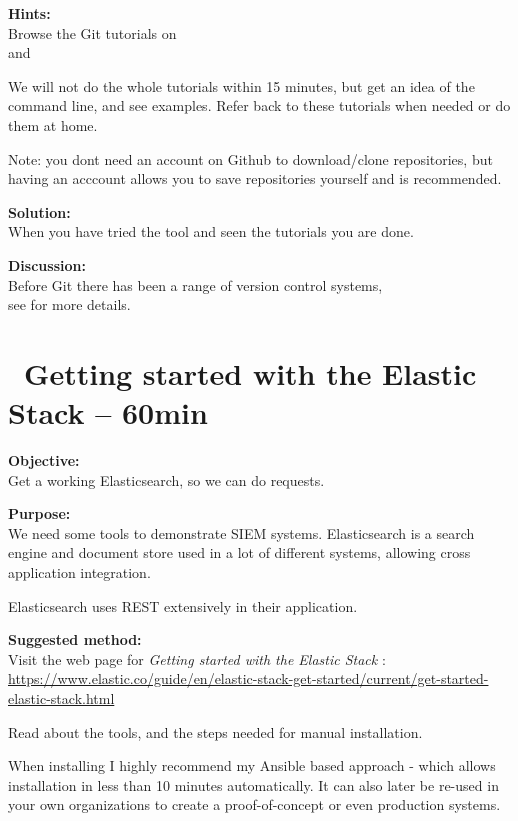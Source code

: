 \documentclass[a4paper,11pt,notitlepage]{report}
\begin{document}
{\bf Hints:}\\
Browse the Git tutorials on \\
and 

We will not do the whole tutorials within 15 minutes, but get an idea of the command line, and see examples. Refer back to these tutorials when needed or do them at home.

Note: you dont need an account on Github to download/clone repositories, but having an acccount allows you to save repositories yourself and is recommended.

{\bf Solution:}\\
When you have tried the tool and seen the tutorials you are done.

{\bf Discussion:}\\
Before Git there has been a range of version control systems,\\
see  for more details.




\chapter{\faExclamationTriangle\ Getting started with the Elastic Stack -- 60min}
\label{gettingstartedelastic}



{\bf Objective:}\\
Get a working Elasticsearch, so we can do requests.

{\bf Purpose:}\\
We need some tools to demonstrate SIEM systems. Elasticsearch is a search engine and document store used in a lot of different systems, allowing cross application integration.

Elasticsearch uses REST extensively in their application.

{\bf Suggested method:}\\
Visit the web page for \emph{Getting started with the Elastic Stack} :\\
{\footnotesize\url{https://www.elastic.co/guide/en/elastic-stack-get-started/current/get-started-elastic-stack.html}}

Read about the tools, and the steps needed for manual installation.

When installing I highly recommend my Ansible based approach - which allows installation in less than 10 minutes automatically. It can also later be re-used in your own organizations to create a proof-of-concept or even production systems.
\end{document}
